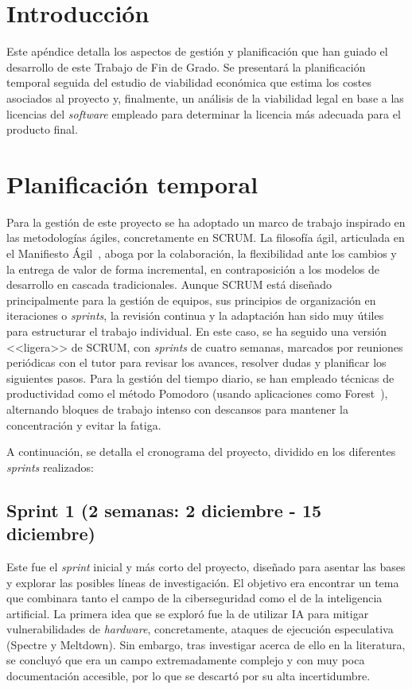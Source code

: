 
\section{Introducción}

Este apéndice detalla los aspectos de gestión y planificación que han guiado el desarrollo de este Trabajo de Fin de Grado. Se presentará la planificación temporal seguida del estudio de viabilidad económica que estima los costes asociados al proyecto y, finalmente, un análisis de la viabilidad legal en base a las licencias del \textit{software} empleado para determinar la licencia más adecuada para el producto final.

\section{Planificación temporal}

Para la gestión de este proyecto se ha adoptado un marco de trabajo inspirado en las metodologías ágiles, concretamente en SCRUM. La filosofía ágil, articulada en el Manifiesto Ágil~\cite{beck2001manifesto}, aboga por la colaboración, la flexibilidad ante los cambios y la entrega de valor de forma incremental, en contraposición a los modelos de desarrollo en cascada tradicionales. Aunque SCRUM está diseñado principalmente para la gestión de equipos, sus principios de organización en iteraciones o \textit{sprints}, la revisión continua y la adaptación han sido muy útiles para estructurar el trabajo individual. En este caso, se ha seguido una versión <<ligera>> de SCRUM, con \textit{sprints} de cuatro semanas, marcados por reuniones periódicas con el tutor para revisar los avances, resolver dudas y planificar los siguientes pasos. Para la gestión del tiempo diario, se han empleado técnicas de productividad como el método Pomodoro (usando aplicaciones como Forest~\cite{forestappForestStay}), alternando bloques de trabajo intenso con descansos para mantener la concentración y evitar la fatiga.

A continuación, se detalla el cronograma del proyecto, dividido en los diferentes \textit{sprints} realizados:

\subsection{Sprint 1 (2 semanas: 2 diciembre - 15 diciembre)}

Este fue el \textit{sprint} inicial y más corto del proyecto, diseñado para asentar las bases y explorar las posibles líneas de investigación. El objetivo era encontrar un tema que combinara tanto el campo de la ciberseguridad como el de la inteligencia artificial. La primera idea que se exploró fue la de utilizar IA para mitigar vulnerabilidades de \textit{hardware}, concretamente, ataques de ejecución especulativa (Spectre y Meltdown). Sin embargo, tras investigar acerca de ello en la literatura, se concluyó que era un campo extremadamente complejo y con muy poca documentación accesible, por lo que se descartó por su alta incertidumbre.

